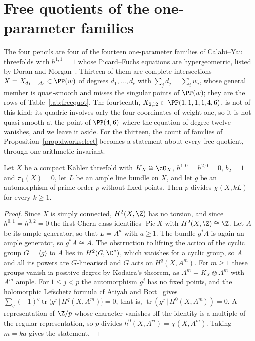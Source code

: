\section{Free quotients of the one-parameter families}\label{sec:freequot}

The four pencils are four of the fourteen one-parameter families of
Calabi--Yau threefolds with $h^{1,1}=1$ whose Picard--Fuchs equations are
hypergeometric, listed by Doran and Morgan~\cite{DM06}. Thirteen of them are
complete intersections $X=X_{d_1,\dots,d_c}\subset\PP(w)$ of degrees
$d_1,\dots,d_c$ with $\sum_jd_j=\sum_iw_i$, whose general member is
quasi-smooth and misses the singular points of $\PP(w)$; they are the rows
of Table~\ref{tab:freequot}. The fourteenth, $X_{2,12}\subset
\PP(1,1,1,1,4,6)$, is not of this kind: its quadric involves only the four
coordinates of weight one, so it is not quasi-smooth at the point of
$\PP(4,6)$ where the equation of degree twelve vanishes, and we leave it
aside. For the thirteen, the count of families of
Proposition~\ref{prop:dworkselect} becomes a statement about every free
quotient, through one arithmetic invariant.

\begin{lemma}\label{lem:freeprime}
Let $X$ be a compact K\"ahler threefold with $K_X\cong\cO_X$,
$h^{1,0}=h^{2,0}=0$, $b_2=1$ and $\pi_1(X)=0$, let $L$ be an ample line
bundle on $X$, and let $g$ be an automorphism of prime order $p$ without
fixed points. Then $p$ divides $\chi(X,kL)$ for every $k\ge1$.
\end{lemma}

\begin{proof}
Since $X$ is simply connected, $H^2(X,\Z)$ has no torsion, and since
$h^{0,1}=h^{0,2}=0$ the first Chern class identifies $\operatorname{Pic}X$
with $H^2(X,\Z)\cong\Z$. Let $A$ be its ample generator, so that $L=A^a$
with $a\ge1$. The bundle $g^*A$ is again an ample generator, so
$g^*A\cong A$. The obstruction to lifting the action of the cyclic group
$G=\langle g\rangle$ to $A$ lies in $H^2(G,\C^*)$, which vanishes for a
cyclic group, so $A$ and all its powers are $G$-linearised and $G$ acts on
$H^q(X,A^m)$. For $m\ge1$ these groups vanish in positive degree by
Kodaira's theorem, as $A^m=K_X\otimes A^m$ with $A^m$ ample. For $1\le
j<p$ the automorphism $g^j$ has no fixed points, and the holomorphic
Lefschetz formula of Atiyah and Bott~\cite{AB68} gives
$\sum_q(-1)^q\operatorname{tr}\big(g^j\,|\,H^q(X,A^m)\big)=0$, that is,
$\operatorname{tr}(g^j\,|\,H^0(X,A^m))=0$. A representation of $\Z/p$ whose
character vanishes off the identity is a multiple of the regular
representation, so $p$ divides $h^0(X,A^m)=\chi(X,A^m)$. Taking $m=ka$
gives the statement.
\end{proof}

